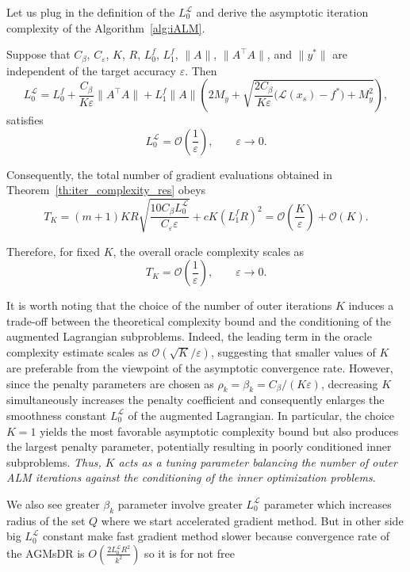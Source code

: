 \documentclass[runningheads]{llncs}
\begin{document}
	Let us plug in the definition of the $L_0^{\mathcal{L}}$ and derive the asymptotic iteration complexity of the Algorithm~\ref{alg:iALM}.
	
	\begin{remark}\label{remark:assym_beta}
		Suppose that \(C_\beta\), \(C_\varepsilon\), \(K\), \(R\), \(L_0^f\), \(L_1^f\), \(\|A\|\), \(\|A^\top A\|\), and \(\|y^*\|\) are independent of the target accuracy \(\varepsilon\). Then
		\[
		L_0^{\mathcal{L}}
		=
		L_0^f
		+
		\frac{C_\beta}{K\varepsilon}\|A^\top A\|
		+
		L_1^f\|A\|
		\left(
		2M_y
		+
		\sqrt{
			\frac{2C_\beta}{K\varepsilon}
			\bigl(\mathcal L(x_s)-f^*\bigr)
			+
			M_y^2
		}
		\right),
		\]
		satisfies
		\[
		L_0^{\mathcal{L}}
		=
		\mathcal O\!\left(\frac{1}{\varepsilon}\right),
		\qquad
		\varepsilon\to0.
		\]
		
		Consequently, the total number of gradient evaluations obtained in
		Theorem~\ref{th:iter_complexity_res} obeys
		\[
		T_K
		=
		(m+1)KR
		\sqrt{
			\frac{10C_\beta L_0^{\mathcal{L}}}
			{C_\varepsilon\varepsilon}
		}
		+
		cK(L_1^fR)^2
		=
		\mathcal O\!\left(\frac{K}{\varepsilon}\right)
		+
		\mathcal O(K).
		\]
		
		Therefore, for fixed \(K\), the overall oracle complexity scales as
		\[
		T_K
		=
		\mathcal O\!\left(\frac{1}{\varepsilon}\right),
		\qquad
		\varepsilon\to0.
		\]
	\end{remark}
	
	It is worth noting that the choice of the number of outer iterations \(K\) induces a trade-off between the theoretical complexity bound and the conditioning of the augmented Lagrangian subproblems. Indeed, the leading term in the oracle complexity estimate scales as \(\mathcal{O}(\sqrt{K}/\varepsilon)\), suggesting that smaller values of \(K\) are preferable from the viewpoint of the asymptotic convergence rate. However, since the penalty parameters are chosen as \(\rho_k=\beta_k=C_\beta/(K\varepsilon)\), decreasing \(K\) simultaneously increases the penalty coefficient and consequently enlarges the smoothness constant \(L_0^{\mathcal{L}}\) of the augmented Lagrangian. In particular, the choice \(K=1\) yields the most favorable asymptotic complexity bound but also produces the largest penalty parameter, potentially resulting in poorly conditioned inner subproblems. \textit{Thus, \(K\) acts as a tuning parameter balancing the number of outer ALM iterations against the conditioning of the inner optimization problems}.
	
	We also see greater $\beta_k$ parameter involve greater $L_0^{\mathcal{L}}$ parameter which increases radius of the set $Q$ where we start accelerated gradient method. But in other side big $L_0^{\mathcal{L}}$ constant make fast gradient method slower because convergence rate of the AGMsDR is $O(\frac{2 L_0^{\mathcal{L}} R^2}{k^2})$ so it is for not free
	
\end{document}

